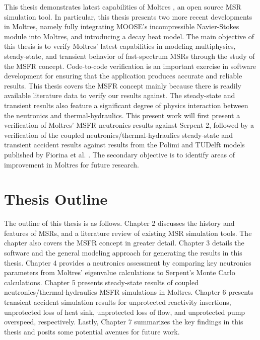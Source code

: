This thesis demonstrates latest capabilities of Moltres
\cite{lindsay_introduction_2018}, an open source MSR simulation tool.
In particular, this thesis presents two more recent
developments in Moltres, namely fully integrating \gls{MOOSE}'s incompressible
Navier-Stokes module into Moltres, and introducing a
decay heat model.
The main objective of this thesis is to verify Moltres'
latest capabilities in modeling multiphysics, steady-state, and transient
behavior of fast-spectrum \glspl{MSR} through the study of the \gls{MSFR}
concept. Code-to-code verification is an important exercise in software
development for ensuring that the application produces accurate and reliable
results. This thesis covers the \gls{MSFR} concept mainly because 
there is readily available literature data to verify our results against. The
steady-state and transient results also feature a significant degree of
physics interaction between the neutronics and thermal-hydraulics. This
present work will first present a verification of Moltres' \gls{MSFR}
neutronics results against Serpent 2, followed by a verification of
the coupled neutronics/thermal-hydraulics steady-state and transient accident
results against results from the Polimi and TUDelft models published by
Fiorina et al. \cite{fiorina_modelling_2014}. The
secondary objective is to identify areas of improvement in Moltres for future
research.

\section{Thesis Outline}

The outline of this thesis is as follows. Chapter 2 discusses the history and
features of \glspl{MSR}, and a literature review of existing \gls{MSR}
simulation tools. The chapter also covers the \gls{MSFR} concept in greater
detail. Chapter 3 details the software and the general modeling
approach for generating the results in this thesis. Chapter 4 provides a
neutronics assessment by comparing key neutronics parameters from Moltres'
eigenvalue calculations to Serpent's Monte Carlo calculations. Chapter 5
presents steady-state results of coupled neutronics/thermal-hydraulics
\gls{MSFR} simulations in Moltres. Chapter 6 presents transient accident
simulation results for unprotected reactivity insertions, unprotected loss of
heat sink, unprotected loss of flow, and unprotected pump overspeed,
respectively. Lastly, Chapter 7 summarizes the key findings in this thesis
and posits some potential avenues for future work.
